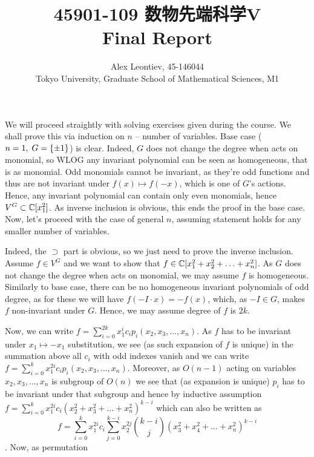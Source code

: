 \documentclass[8pt]{article} %
\title{45901-109 数物先端科学V\\Final Report}
\author{Alex Leontiev, 45-146044
\\Tokyo University, Graduate School of Mathematical Sciences, M1}
\begin{document}
\begin{CJK}{UTF8}{bsmi}
\maketitle
\end{CJK}
We will proceed straightly with solving exercises given during the course.
We shall prove this via induction on $n$ -- number of variables. Base case ($n=1,\;G=\left\{ \pm1 \right\}$) is clear. Indeed, $G$
does not change the degree when acts on monomial, so WLOG any invariant polynomial can be seen as homogeneous, that is as monomial.
Odd monomials cannot be invariant, as they're odd functions and thus are not invariant under $f(x)\mapsto f(-x)$, which is one
of $G$'s actions. Hence, any invariant polynomial can contain only even monomials, hence $V^G\subset\mathbb{C}[x_1^2]$. As inverse inclusion
is obvious, this ends the proof in the base case. Now, let's proceed with the case of general $n$, assuming statement holds for any
smaller number of variables.\par
Indeed, the $\supset$ part is obvious, so we just need to prove the inverse inclusion. Assume $f\in V^G$ and we want to show
that $f\in\mathbb{C}[x_1^2+x_2^2+\hdots+x_n^2]$. As $G$ does not change the degree when acts on monomial, we may assume $f$ is homogeneous.
Similarly to base case,
there can be no homogeneous invariant polynomials of odd degree, as for these we will have $f(-I\cdot x)=-f(x)$,
which, as $-I\in G$, makes $f$ non-invariant under $G$. Hence, we may assume degree of $f$ is $2k$.\par
Now, we can write $f=\sum_{i=0}^{ 2k }x_1^{ i }c_ip_i(x_2,x_3,\hdots,x_n)$. As $f$ has to be invariant under $x_1\mapsto -x_1$
substitution, we see (as such expansion of $f$ is unique) in the summation above all $c_i$ with odd indexes vanish and we can write
$f=\sum_{i=0}^{ k }x_1^{ 2i }c_ip_i(x_2,x_3,\hdots,x_n)$. Moreover, as $O(n-1)$ acting on variables $x_2,x_3,\hdots,x_n$
is subgroup of $O(n)$ we see that (as expansion is unique) $p_i$ has to be invariant under that subgroup and hence
by inductive assumption $f=\sum_{i=0}^{ k }x_1^{ 2i }c_i(x_2^2+x_3^2+\hdots+x_n^2)^{ k-i }$ which can also be written as
\begin{equation}\label{Prob1}
	f=\sum_{i=0}^{ k }x_1^{ 2i }c_i\sum_{ j=0 }^{ k-i }x_2^{ 2j }\binom{k-i}{j}(x_3^2+x_4^2+\hdots+x_n^2)^{ k-i }
\end{equation}. Now, as permutation
\end{document}
